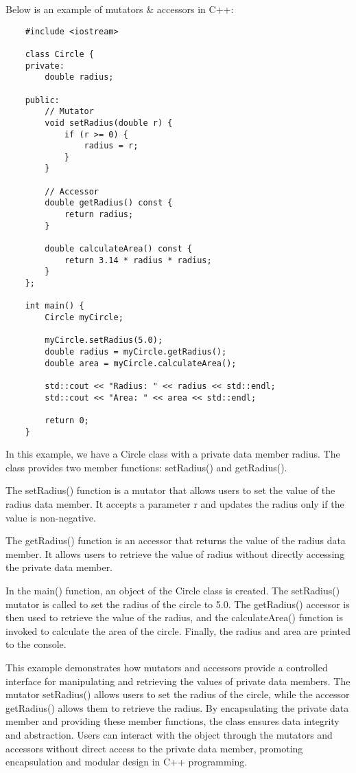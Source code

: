 \begin{solution}
    Below is an example of mutators \& accessors in C++: \\
    \horizontalline
    \begin{verbatim}
    #include <iostream>

    class Circle {
    private:
        double radius;
        
    public:
        // Mutator
        void setRadius(double r) {
            if (r >= 0) {
                radius = r;
            }
        }
        
        // Accessor
        double getRadius() const {
            return radius;
        }
        
        double calculateArea() const {
            return 3.14 * radius * radius;
        }
    };
    
    int main() {
        Circle myCircle;
        
        myCircle.setRadius(5.0);
        double radius = myCircle.getRadius();
        double area = myCircle.calculateArea();
        
        std::cout << "Radius: " << radius << std::endl;
        std::cout << "Area: " << area << std::endl;
        
        return 0;
    }        
    \end{verbatim}
    
    \horizontalline

    In this example, we have a Circle class with a private data member radius. The class provides two member functions: setRadius() and getRadius().

    \noindent The setRadius() function is a mutator that allows users to set the value of the radius data member. It accepts a parameter r and updates the radius only if the value is non-negative.

    \noindent The getRadius() function is an accessor that returns the value of the radius data member. It allows users to retrieve the value of radius without directly accessing the private data member.

    \noindent In the main() function, an object of the Circle class is created. The setRadius() mutator is called to set the radius of the circle to 5.0. The getRadius() accessor is then used to retrieve the value of the 
    radius, and the calculateArea() function is invoked to calculate the area of the circle. Finally, the radius and area are printed to the console.

    \noindent This example demonstrates how mutators and accessors provide a controlled interface for manipulating and retrieving the values of private data members. The mutator setRadius() allows users to set the radius 
    of the circle, while the accessor getRadius() allows them to retrieve the radius. By encapsulating the private data member and providing these member functions, the class ensures data integrity and abstraction. Users 
    can interact with the object through the mutators and accessors without direct access to the private data member, promoting encapsulation and modular design in C++ programming.
\end{solution}

